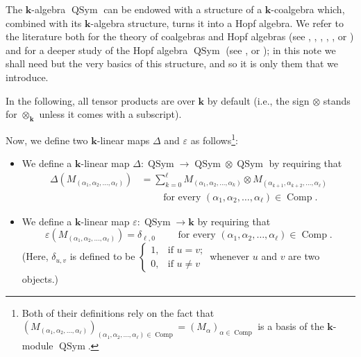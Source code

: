 \documentclass[12pt]{article}
\theoremstyle{plain}
\theoremstyle{definition}
\theoremstyle{remark}
\let\sumnonlimits\sum
\renewcommand{\sum}{\sumnonlimits\limits}
\newcommand{\kk}{{\mathbf{k}}}
\newcommand{\Comp}{{\operatorname{Comp}}}
\newcommand{\QSym}{{\operatorname{QSym}}}
\begin{document}
The $\kk$-algebra $\QSym$ can be endowed with a structure of a
$\kk$-coalgebra which, combined with its $\kk$-algebra structure,
turns it into a Hopf algebra. We refer to the literature both for
the theory of coalgebras and Hopf algebras
(see
\cite{Montg-Hopf}, \cite[\S 1]{Reiner}, \cite[\S 1-\S 2]{Manchon-HA},
\cite{Abe-HA}, \cite{Sweedler-HA}, \cite{Dasca-HA} or
\cite[Chapter 7]{Fresse-Op})
and for a deeper study of the Hopf algebra $\QSym$ (see
\cite{Malve-Thesis}, \cite[Chapter 6]{HGK} or
\cite[\S 5]{Reiner}); in this note we shall need but the very
basics of this structure, and so it is only them that we introduce.

In the following, all tensor products are over $\kk$ by
default (i.e., the sign $\otimes$ stands for $\otimes_{\kk}$ unless
it comes with a subscript).

Now, we define two $\kk$-linear maps $\Delta$ and $\varepsilon$
as follows\footnote{Both of their definitions rely on the fact
that
$\left( M_{\left(\alpha_1, \alpha_2, \ldots, \alpha_\ell\right)} \right)_{
   \left(\alpha_1, \alpha_2, \ldots, \alpha_\ell\right) \in \Comp}
= \left( M_\alpha \right)_{\alpha \in \Comp}$
is a basis of the $\kk$-module $\QSym$.}:
\begin{itemize}
\item
We define a $\kk$-linear map $\Delta : \QSym \to \QSym \otimes \QSym$
by requiring that
\begin{align}
\label{eq.coproduct.M}
\Delta \left( M_{\left( \alpha_1, \alpha_2, \ldots, \alpha_\ell
\right) }\right)
&= \sum_{k=0}^{\ell} M_{\left( \alpha_1, \alpha_2, \ldots,
\alpha_k \right) } \otimes M_{\left( \alpha_{k+1}, \alpha_{k+2},
\ldots, \alpha_\ell \right) } \\
& \qquad \text{ for every } \left(\alpha_1, \alpha_2,
\ldots, \alpha_\ell\right) \in \Comp . \nonumber
\end{align}
\item We define a $\kk$-linear map
$\varepsilon : \QSym \to \kk$ by requiring that
\[
\varepsilon\left(  M_{\left(
\alpha_1, \alpha_2, \ldots, \alpha_\ell \right) }\right)
= \delta_{\ell, 0}
\qquad \text{ for every } \left(\alpha_1, \alpha_2,
\ldots, \alpha_\ell\right) \in \Comp .
\]
(Here, $\delta_{u,v}$ is defined to be
$\begin{cases}
1, & \text{if }u = v \text{;}\\
0, & \text{if }u \neq v
\end{cases}$
whenever $u$ and $v$ are two objects.)
\end{itemize}
\end{document}
